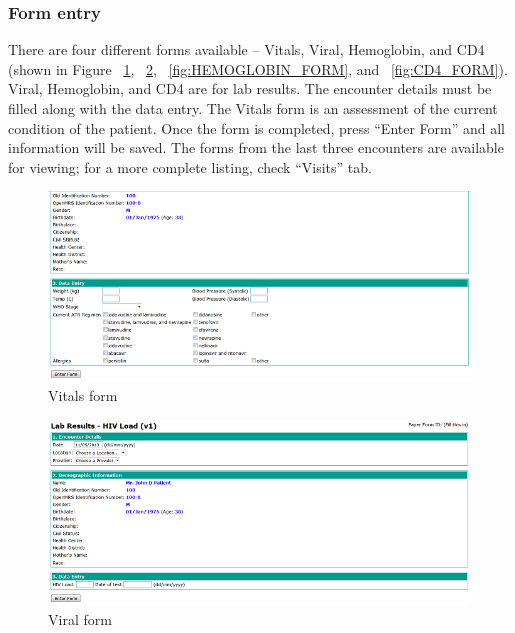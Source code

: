 \documentclass[12pt,letterpaper]{article}
\begin{document}
\subsubsection{Form entry}
	There are four different forms available – Vitals, Viral, Hemoglobin, and CD4 (shown in Figure ~\ref{fig:VITALS_FORM}, 
	~\ref{fig:VIRAL_FORM}, ~\ref{fig:HEMOGLOBIN_FORM}, 
	and ~\ref{fig:CD4_FORM}). Viral, Hemoglobin, and CD4 are for lab results. The encounter details must be filled along with the data entry. The Vitals form is an assessment of the current condition of the patient. Once the form is completed, press “Enter Form” and all information will be saved. 
	The forms from the last three encounters are available for viewing; for a more complete listing, check “Visits” tab.

\begin{figure}[htbp]
\begin{center}
\includegraphics[width=6.5in]{user_guide/vitals_form.png}
\end{center}
\caption{Vitals form}
\label{fig:VITALS_FORM}
\end{figure}

\begin{figure}[htbp]
\begin{center}
\includegraphics[width=6.5in]{user_guide/viral_form.png}
\end{center}
\caption{Viral form}
\label{fig:VIRAL_FORM}
\end{figure}
\end{document}
